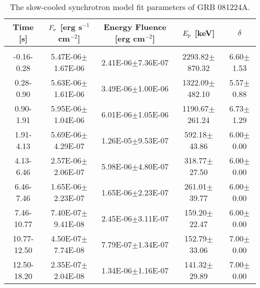 \begin{table}[h]
\centering
\scriptsize
\label{tab:}
\begin{tabular}{c| c c c c}
Time [s] & $F_{\nu}$ [erg s$^{-1}$ cm$^{-2}$] & Energy Fluence [erg cm$^{-2}$] & $E_{\rm p}$ [keV] & $\delta$ \\
\hline \hline\\ 

-0.16-0.28 & 5.47E-06$\pm$1.67E-06 & 2.41E-06$\pm$7.36E-07 & 2293.82$\pm$870.32 & 6.60$\pm$1.53 \\ 

0.28-0.90 & 5.63E-06$\pm$1.61E-06 & 3.49E-06$\pm$1.00E-06 & 1322.09$\pm$482.10 & 5.57$\pm$0.88 \\ 

0.90-1.91 & 5.95E-06$\pm$1.04E-06 & 6.01E-06$\pm$1.05E-06 & 1190.67$\pm$261.24 & 6.73$\pm$1.29 \\ 

1.91-4.13 & 5.69E-06$\pm$4.29E-07 & 1.26E-05$\pm$9.53E-07 & 592.18$\pm$43.86 & 6.00$\pm$0.00 \\ 

4.13-6.46 & 2.57E-06$\pm$2.06E-07 & 5.98E-06$\pm$4.80E-07 & 318.77$\pm$27.50 & 6.00$\pm$0.00 \\ 

6.46-7.46 & 1.65E-06$\pm$2.23E-07 & 1.65E-06$\pm$2.23E-07 & 261.01$\pm$39.77 & 6.00$\pm$0.00 \\ 

7.46-10.77 & 7.40E-07$\pm$9.41E-08 & 2.45E-06$\pm$3.11E-07 & 159.20$\pm$22.47 & 6.00$\pm$0.00 \\ 

10.77-12.50 & 4.50E-07$\pm$7.74E-08 & 7.79E-07$\pm$1.34E-07 & 152.79$\pm$33.06 & 7.00$\pm$0.00 \\ 

12.50-18.20 & 2.35E-07$\pm$2.04E-08 & 1.34E-06$\pm$1.16E-07 & 141.32$\pm$29.89 & 7.00$\pm$0.00 \\ 

\end{tabular}
\caption{The slow-cooled synchrotron model fit parameters of GRB 081224A.}
\end{table}

